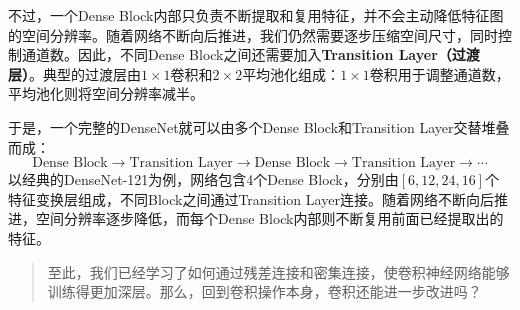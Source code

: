 不过，一个Dense Block内部只负责不断提取和复用特征，并不会主动降低特征图的空间分辨率。随着网络不断向后推进，我们仍然需要逐步压缩空间尺寸，同时控制通道数。因此，不同Dense Block之间还需要加入\textbf{Transition Layer（过渡层）}。典型的过渡层由$1\times1$卷积和$2\times2$平均池化组成：$1\times1$卷积用于调整通道数，平均池化则将空间分辨率减半。

于是，一个完整的DenseNet就可以由多个Dense Block和Transition Layer交替堆叠而成：
$$
\text{Dense Block}\rightarrow\text{Transition Layer}\rightarrow\text{Dense Block}\rightarrow\text{Transition Layer}\rightarrow\cdots
$$
以经典的DenseNet-121为例，网络包含4个Dense Block，分别由$[6,12,24,16]$个特征变换层组成，不同Block之间通过Transition Layer连接。随着网络不断向后推进，空间分辨率逐步降低，而每个Dense Block内部则不断复用前面已经提取出的特征。

\begin{quote}
    至此，我们已经学习了如何通过残差连接和密集连接，使卷积神经网络能够训练得更加深层。那么，回到卷积操作本身，卷积还能进一步改进吗？
\end{quote}